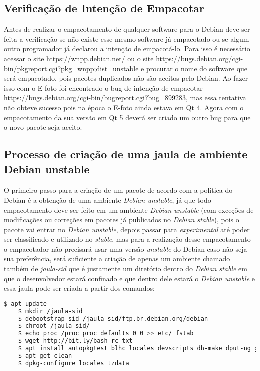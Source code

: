 \subsection{Verificação de Intenção de Empacotar}

Antes de realizar o empacotamento de qualquer software para o Debian deve ser feita a verificação se não existe esse mesmo software já empacotado ou se algum outro programador já declarou a intenção de empacotá-lo. Para isso é necessário acessar o site \url{https://wnpp.debian.net/} ou o site \url{https://bugs.debian.org/cgi-bin/pkgreport.cgi?pkg=wnpp;dist=unstable} e procurar o nome do software que será empacotado, pois pacotes duplicados não são aceitos pelo Debian. Ao fazer isso com o E-foto foi encontrado o bug de intenção de empacotar \url{https://bugs.debian.org/cgi-bin/bugreport.cgi?bug=899283}, mas essa tentativa não obteve sucesso pois na época o E-foto ainda estava em Qt 4. Agora com o empacotamento da sua versão em Qt 5 deverá ser criado um outro bug para que o novo pacote seja aceito. %

\subsection{Processo de criação de uma jaula de ambiente Debian unstable}

O primeiro passo para a criação de um pacote de acordo com a política do Debian é a obtenção de uma ambiente \textit{Debian unstable}, já que todo empacotamento deve ser feito em um ambiente \textit{Debian unstable} (com exceções de modificações ou correções em pacotes já publicados no \textit{Debian stable}), pois o pacote vai entrar no \textit{Debian unstable}, depois passar para \textit{experimental} até poder ser classificado e utilizado no \textit{stable}, mas para a realização desse empacotamento o empacotador não precisará usar uma versão \textit{unstable} do Debian caso não seja sua preferência, será suficiente a criação de apenas um ambiente chamado também de \textit{jaula-sid} que é justamente um diretório dentro do \textit{Debian stable} em que o desenvolvedor estará confinado e que dentro dele estará o \textit{Debian unstable} e essa jaula pode ser criada a partir dos comandos: %

\begin{lstlisting}[language=bash]
	$ apt update
	$ mkdir /jaula-sid
	$ debootstrap sid /jaula-sid/ftp.br.debian.org/debian
	$ chroot /jaula-sid/
	$ echo proc /proc proc defaults 0 0 >> etc/ fstab
	$ wget http://bit.ly/bash-rc-txt
	$ apt install autopkgtest blhc locales devscripts dh-make dput-ng git-buildpackage mc quilt spell tardiff tree lintian
	$ apt-get clean
	$ dpkg-configure locales tzdata
\end{lstlisting}

